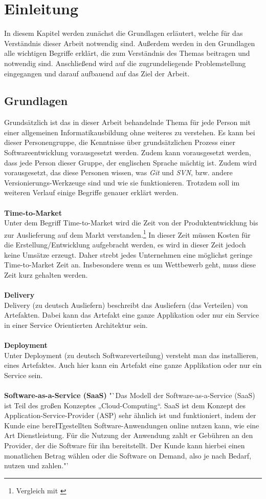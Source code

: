 \chapter{Einleitung}
\label{chap:einleitung}
In diesem Kapitel werden zunächst die Grundlagen erläutert, welche für das Verständnis dieser Arbeit notwendig sind. Außerdem werden in den Grundlagen alle wichtigen Begriffe erklärt, die zum Verständnis des Themas beitragen und notwendig sind. Anschließend wird auf die zugrundeliegende Problemstellung eingegangen und darauf aufbauend auf das Ziel der Arbeit.

\section{Grundlagen}
\label{sec:grundlagen}
Grundsätzlich ist das in dieser Arbeit behandelnde Thema für jede Person mit einer allgemeinen Informatikausbildung ohne weiteres zu verstehen. Es kann bei dieser Personengruppe, die Kenntnisse über grundsätzlichen Prozess einer Softwareentwicklung vorausgesetzt werden. Zudem kann vorausgesetzt werden, dass jede Person dieser Gruppe, der englischen Sprache mächtig ist. Zudem wird vorausgesetzt, das diese Personen wissen, was \textit{Git} und \textit{SVN}, bzw. andere Versionierungs-Werkzeuge sind und wie sie funktionieren. Trotzdem soll im weiteren Verlauf einige Begriffe genauer erklärt werden.
\\\\
\textbf{Time-to-Market}\\
Unter dem Begriff Time-to-Market wird die Zeit von der Produktentwicklung bis zur Auslieferung auf dem Markt verstanden.\footnote{Vergleich mit \cite{ttm}} In dieser Zeit müssen Kosten für die Erstellung/Entwicklung aufgebracht werden, es wird in dieser Zeit jedoch keine Umsätze erzeugt. Daher strebt jedes Unternehmen eine möglichst geringe Time-to-Market Zeit an. Insbesondere wenn es um Wettbewerb geht, muss diese Zeit kurz gehalten werden.
\\\\
\textbf{Delivery}\\
Delivery (zu deutsch Ausliefern) beschreibt das Ausliefern (das Verteilen) von Artefakten. Dabei kann das Artefakt eine ganze Applikation oder nur ein Service in einer Service Orientierten Architektur sein.
\\\\
\textbf{Deployment}\\
Unter Deployment (zu deutsch Softwareverteilung) versteht man das installieren, eines Artefaktes. Auch hier kann ein Artefakt eine ganze Applikation oder nur ein Service sein.
\\\\
\textbf{Software-as-a-Service (SaaS)}
"`Das Modell der Software-as-a-Service (SaaS) ist Teil des großen Konzeptes „Cloud-Computing“. SaaS ist dem Konzept des Application-Service-Provider (ASP) sehr ähnlich ist und funktioniert, indem der Kunde eine bereITgestellten Software-Anwendungen online nutzen kann, wie eine Art Dienstleistung. Für die Nutzung der Anwendung zahlt er Gebühren an den Provider, der die Software für ihn bereitstellt. Der Kunde kann hierbei einen monatlichen Betrag wählen oder die Software on Demand, also je nach Bedarf, nutzen und zahlen."'\cite{SaaS}

